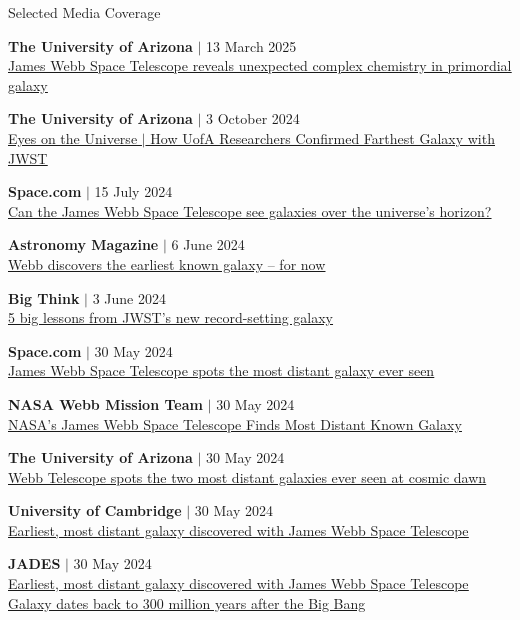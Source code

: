 \documentclass{JMH_CV}
\begin{document}
\begin{rSection}{Selected Media Coverage}

\textbf{The University of Arizona} $\vert$ 13 March 2025 %
\\ \href{https://astro.arizona.edu/news/james-webb-space-telescope-reveals-unexpected-complex-chemistry-primordial-galaxy}{\ul{James Webb Space Telescope reveals unexpected complex chemistry in primordial galaxy}}

\textbf{The University of Arizona} $\vert$ 3 October 2024 %
\\ \href{https://www.youtube.com/watch?v=FR7VGHauNxw}{\ul{Eyes on the Universe $\vert$ How UofA Researchers Confirmed Farthest Galaxy with JWST}}

\textbf{Space.com} $\vert$ 15 July 2024 %
\\ \href{https://www.space.com/james-webb-space-telescope-universe-expansion-photon-horizon}{\ul{Can the James Webb Space Telescope see galaxies over the universe's horizon?}}

\textbf{Astronomy Magazine} $\vert$ 6 June 2024 %
\\ \href{https://www.astronomy.com/science/webb-discovers-the-earliest-known-galaxy-for-now/}{\ul{Webb discovers the earliest known galaxy -- for now}}

\textbf{Big Think} $\vert$ 3 June 2024 %
\\ \href{https://bigthink.com/starts-with-a-bang/5-lessons-jwst-record-galaxy/}{\ul{5 big lessons from JWST's new record-setting galaxy}}

\textbf{Space.com} $\vert$ 30 May 2024 %
\\ \href{https://www.space.com/james-webb-space-telescope-two-oldest-most-distant-galaxies}{\ul{James Webb Space Telescope spots the most distant galaxy ever seen}}

\textbf{NASA Webb Mission Team} $\vert$ 30 May 2024 %
\\ \href{https://science.nasa.gov/blogs/webb/2024/05/30/nasas-james-webb-space-telescope-finds-most-distant-known-galaxy/}{\ul{NASA's James Webb Space Telescope Finds Most Distant Known Galaxy}}

\textbf{The University of Arizona} $\vert$ 30 May 2024 %
\\ \href{https://news.arizona.edu/news/webb-telescope-spots-two-most-distant-galaxies-ever-seen-cosmic-dawn}{\ul{Webb Telescope spots the two most distant galaxies ever seen at cosmic dawn}}

\textbf{University of Cambridge} $\vert$ 30 May 2024 %
\\ \href{https://www.cam.ac.uk/research/news/earliest-most-distant-galaxy-discovered-with-james-webb-space-telescope}{\ul{Earliest, most distant galaxy discovered with James Webb Space Telescope}}

\textbf{JADES} $\vert$ 30 May 2024  %
\\ \href{https://jades-survey.github.io/high-redshift/new-redshift-record/}{\ul{Earliest, most distant galaxy discovered with James Webb Space Telescope Galaxy dates back to 300 million years after the Big Bang}}

\end{rSection}
\end{document}
